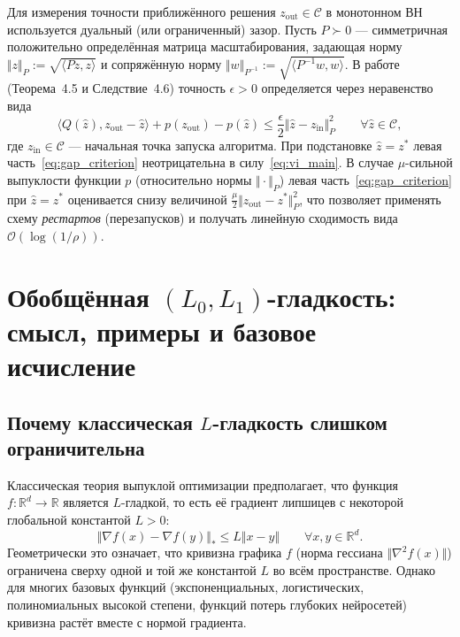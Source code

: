 \documentclass[11pt, a4paper]{article}
\theoremstyle{definition}
\begin{document}
Для измерения точности приближённого решения $z_{\mathrm{out}} \in \mathcal{C}$ в монотонном ВН используется дуальный (или ограниченный) зазор. Пусть $P \succ 0$ --- симметричная положительно определённая матрица масштабирования, задающая норму $\Vert z \Vert_P := \sqrt{\langle P z, z \rangle}$ и сопряжённую норму $\Vert w \Vert_{P^{-1}} := \sqrt{\langle P^{-1} w, w \rangle}$. В работе~\cite{Borodich2025} (Теорема~4.5 и Следствие~4.6) точность $\epsilon > 0$ определяется через неравенство вида
\begin{equation}\label{eq:gap_criterion}
\langle Q(\hat{z}), z_{\mathrm{out}} - \hat{z} \rangle + p(z_{\mathrm{out}}) - p(\hat{z}) \le \frac{\epsilon}{2} \Vert \hat{z} - z_{\mathrm{in}} \Vert_P^2 \qquad \forall \hat{z} \in \mathcal{C},
\end{equation}
где $z_{\mathrm{in}} \in \mathcal{C}$ --- начальная точка запуска алгоритма. При подстановке $\hat{z} = z^*$ левая часть~\eqref{eq:gap_criterion} неотрицательна в силу~\eqref{eq:vi_main}. В случае $\mu$-сильной выпуклости функции $p$ (относительно нормы $\Vert \cdot \Vert_P$) левая часть~\eqref{eq:gap_criterion} при $\hat{z} = z^*$ оценивается снизу величиной $\frac{\mu}{2} \Vert z_{\mathrm{out}} - z^* \Vert_P^2$, что позволяет применять схему \emph{рестартов} (перезапусков) и получать линейную сходимость вида $\mathcal{O}(\log(1/\rho))$.

\section{Обобщённая $(L_0, L_1)$-гладкость: смысл, примеры и базовое исчисление}

\subsection{Почему классическая $L$-гладкость слишком ограничительна}

Классическая теория выпуклой оптимизации предполагает, что функция $f : \mathbb{R}^d \to \mathbb{R}$ является $L$-гладкой, то есть её градиент липшицев с некоторой глобальной константой $L > 0$:
\begin{equation}\label{eq:classical_L}
\Vert \nabla f(x) - \nabla f(y) \Vert_* \le L \Vert x - y \Vert \qquad \forall x, y \in \mathbb{R}^d.
\end{equation}
Геометрически это означает, что кривизна графика $f$ (норма гессиана $\Vert \nabla^2 f(x) \Vert$) ограничена сверху одной и той же константой $L$ во всём пространстве. Однако для многих базовых функций (экспоненциальных, логистических, полиномиальных высокой степени, функций потерь глубоких нейросетей) кривизна растёт вместе с нормой градиента.
\end{document}
